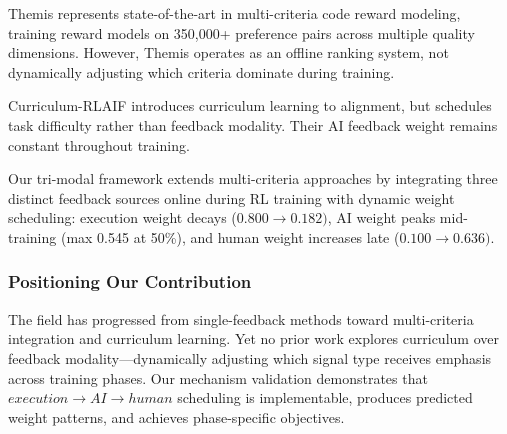 Themis \citep{PaulEtAl2026Themis} represents state-of-the-art in multi-criteria code reward modeling, training reward models on 350,000+ preference pairs across multiple quality dimensions. However, Themis operates as an offline ranking system, not dynamically adjusting which criteria dominate during training.

Curriculum-RLAIF \citep{LiEtAl2025CurriculumRLAIF} introduces curriculum learning to alignment, but schedules task difficulty rather than feedback modality. Their AI feedback weight remains constant throughout training.

Our tri-modal framework extends multi-criteria approaches by integrating three distinct feedback sources online during RL training with dynamic weight scheduling: execution weight decays (0.$800\rightarrow 0.182)$, AI weight peaks mid-training (max 0.545 at 50\%), and human weight increases late (0.$100\rightarrow 0.636)$.

\subsubsection{Positioning Our Contribution}

The field has progressed from single-feedback methods toward multi-criteria integration and curriculum learning. Yet no prior work explores curriculum over feedback modality---dynamically adjusting which signal type receives emphasis across training phases. Our mechanism validation demonstrates that $execution\rightarrow AI\rightarrow human$ scheduling is implementable, produces predicted weight patterns, and achieves phase-specific objectives.
